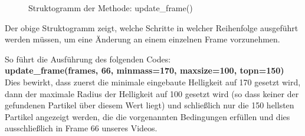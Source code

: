 \begin{figure}[H]
  \centering
  \caption{Struktogramm der Methode: update\_frame()}
  \label{fig:kap3_strukto_update_frame}
\end{figure}

Der obige Struktogramm zeigt, welche Schritte in welcher Reihenfolge ausgeführt werden müssen, um eine Änderung an einem einzelnen Frame vorzunehmen.

So führt die Ausführung des folgenden Codes:\\
\textbf{update\_frame(frames, 66, minmass=170, maxsize=100, topn=150)}\\
Dies bewirkt, dass zuerst die minimale eingebaute Helligkeit auf 170 gesetzt wird, dann der maximale Radius der Helligkeit auf 100 gesetzt wird (so dass keiner der gefundenen Partikel über diesem Wert liegt) und schließlich nur die 150 hellsten Partikel angezeigt werden, die die vorgenannten Bedingungen erfüllen und dies ausschließlich in Frame 66 unseres Videos.






